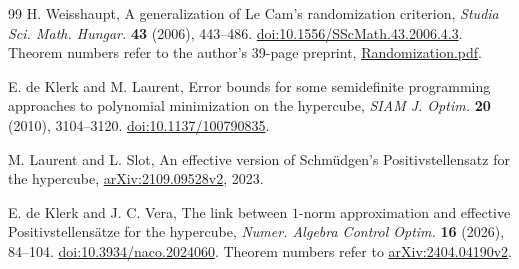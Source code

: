 \begin{thebibliography}{99}
H. Weisshaupt, A generalization of Le Cam's randomization criterion,
\emph{Studia Sci. Math. Hungar.} \textbf{43} (2006), 443--486.
\href{https://doi.org/10.1556/SScMath.43.2006.4.3}{doi:10.1556/SScMath.43.2006.4.3}.
Theorem numbers refer to the author's 39-page preprint,
\href{https://www.weiszhaupt.at/publications/Randomization.pdf}{Randomization.pdf}.


E. de Klerk and M. Laurent, Error bounds for some semidefinite
programming approaches to polynomial minimization on the hypercube,
\emph{SIAM J. Optim.} \textbf{20} (2010), 3104--3120.
\href{https://doi.org/10.1137/100790835}{doi:10.1137/100790835}.


M. Laurent and L. Slot, An effective version of Schm\"udgen's
Positivstellensatz for the hypercube,
\href{https://arxiv.org/abs/2109.09528v2}{arXiv:2109.09528v2}, 2023.


E. de Klerk and J. C. Vera, The link between $1$-norm approximation
and effective Positivstellens\"atze for the hypercube,
\emph{Numer. Algebra Control Optim.} \textbf{16} (2026), 84--104.
\href{https://doi.org/10.3934/naco.2024060}{doi:10.3934/naco.2024060}.
Theorem numbers refer to
\href{https://arxiv.org/abs/2404.04190v2}{arXiv:2404.04190v2}.

\end{thebibliography}
